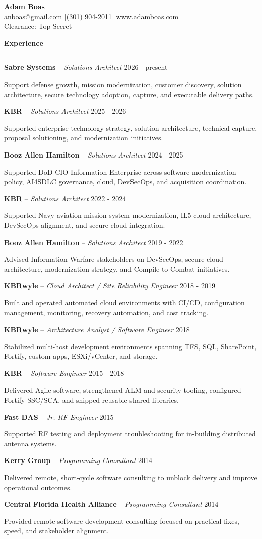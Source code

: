 \documentclass[10pt]{article}
\newcommand{\ResumeSection}[1]{\vspace{0.16em}\noindent\textbf{\large #1}\par\nointerlineskip\textcolor{accentgold}{\rule{\textwidth}{0.75pt}}\vspace{0.01em}}
\newcommand{\Role}[4]{%
{\footnotesize\textbf{#1} -- \textit{#2} \hfill #3}\par
{\scriptsize #4}\par\vspace{0.03em}
}
\begin{document}
\setlength{\parskip}{0.10em}

\begin{center}
{\LARGE\bfseries Adam Boas}\\
\small \href{mailto:anboas@gmail.com}{anboas@gmail.com} \quad|\quad (301) 904-2011 \quad|\quad \href{https://www.adamboas.com}{www.adamboas.com}\\
\small Clearance: Top Secret
\end{center}

\ResumeSection{Experience}
\Role{Sabre Systems}{Solutions Architect}{2026 - present}{Support defense growth, mission modernization, customer discovery, solution architecture, secure technology adoption, capture, and executable delivery paths.}
\Role{KBR}{Solutions Architect}{2025 - 2026}{Supported enterprise technology strategy, solution architecture, technical capture, proposal solutioning, and modernization initiatives.}
\Role{Booz Allen Hamilton}{Solutions Architect}{2024 - 2025}{Supported DoD CIO Information Enterprise across software modernization policy, AI4SDLC governance, cloud, DevSecOps, and acquisition coordination.}
\Role{KBR}{Solutions Architect}{2022 - 2024}{Supported Navy aviation mission-system modernization, IL5 cloud architecture, DevSecOps alignment, and secure cloud integration.}
\Role{Booz Allen Hamilton}{Solutions Architect}{2019 - 2022}{Advised Information Warfare stakeholders on DevSecOps, secure cloud architecture, modernization strategy, and Compile-to-Combat initiatives.}
\Role{KBRwyle}{Cloud Architect / Site Reliability Engineer}{2018 - 2019}{Built and operated automated cloud environments with CI/CD, configuration management, monitoring, recovery automation, and cost tracking.}
\Role{KBRwyle}{Architecture Analyst / Software Engineer}{2018}{Stabilized multi-host development environments spanning TFS, SQL, SharePoint, Fortify, custom apps, ESXi/vCenter, and storage.}
\Role{KBR}{Software Engineer}{2015 - 2018}{Delivered Agile software, strengthened ALM and security tooling, configured Fortify SSC/SCA, and shipped reusable shared libraries.}
\Role{Fast DAS}{Jr. RF Engineer}{2015}{Supported RF testing and deployment troubleshooting for in-building distributed antenna systems.}
\Role{Kerry Group}{Programming Consultant}{2014}{Delivered remote, short-cycle software consulting to unblock delivery and improve operational outcomes.}
\Role{Central Florida Health Alliance}{Programming Consultant}{2014}{Provided remote software development consulting focused on practical fixes, speed, and stakeholder alignment.}
\end{document}
